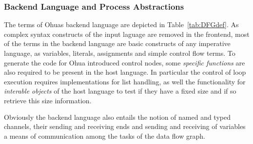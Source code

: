 \subsubsection{Backend Language and Process Abstractions}

The terms of Ohuas backend language are depicted in Table~\ref{tab:DFGdef}. As complex syntax constructs of the input laguage are removed in the frontend, most of the terms in the backend language are basic constructs of any imperative language, as variables, literals, assignments and simple control flow terms. To generate the code for Ohua introduced control nodes, some \emph{specific functions} are also required to be present in the host language. In particular the control of loop execution requires implementations for list handling, as well the functionality for \emph{interable objects} of the host language to test if they have a fixed size and if so retrieve this size information. 

Obviously the backend language also entails the notion of named and typed channels, their sending and receiving ends and sending and receiving of variables a means of communication among the tasks of the data flow graph. 

